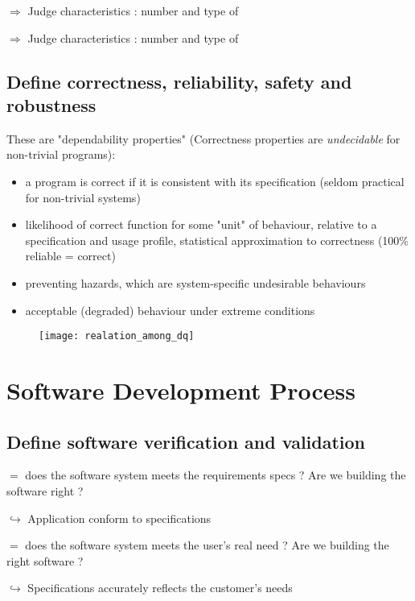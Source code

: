 \begin{minipage}[t]{0.48\textwidth}
    $\Rightarrow$ Judge  characteristics : number and type of 
\end{minipage}
\hfill
\begin{minipage}[t]{0.48\textwidth}
    $\Rightarrow$ Judge  characteristics : number and type of 
\end{minipage}

\newpage
\section{Define correctness, reliability, safety and robustness}

These are "dependability properties" (Correctness properties are \textit{undecidable} for non-trivial programs): 
\begin{itemize}
    \item  {} a program is correct if it is consistent with its specification (seldom practical for non-trivial systems)
    \item  {} likelihood of correct function for some "unit" of behaviour, relative to a specification and usage profile, statistical approximation to correctness (100\% reliable = correct)
    \item  {} preventing hazards, which are system-specific undesirable behaviours
    \item  {} acceptable (degraded) behaviour under extreme conditions
\end{itemize}

\begin{figure}[H]
    \centering
    \texttt{[image: realation\_among\_dq]}
\end{figure}

\chapter{Software Development Process}

\section{Define software verification and validation}

\begin{minipage}[t]{0.48\textwidth}
     $=$ does the software system meets the requirements specs ? Are we building the software right ?
    
    $\hookrightarrow$ Application conform to specifications
\end{minipage}
\hfill
\begin{minipage}[t]{0.48\textwidth}
     $=$ does the software system meets the user's real need ? Are we building the right software ?
    
    $\hookrightarrow$ Specifications accurately reflects the customer's needs
\end{minipage}

